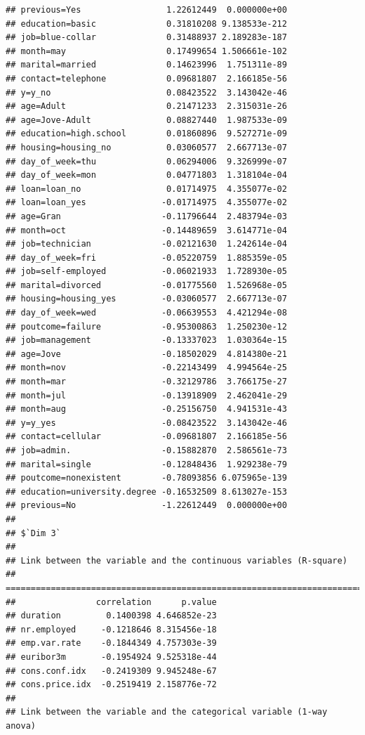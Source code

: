 \documentclass[
]{article}
\begin{document}
\begin{verbatim}
## previous=Yes                 1.22612449  0.000000e+00
## education=basic              0.31810208 9.138533e-212
## job=blue-collar              0.31488937 2.189283e-187
## month=may                    0.17499654 1.506661e-102
## marital=married              0.14623996  1.751311e-89
## contact=telephone            0.09681807  2.166185e-56
## y=y_no                       0.08423522  3.143042e-46
## age=Adult                    0.21471233  2.315031e-26
## age=Jove-Adult               0.08827440  1.987533e-09
## education=high.school        0.01860896  9.527271e-09
## housing=housing_no           0.03060577  2.667713e-07
## day_of_week=thu              0.06294006  9.326999e-07
## day_of_week=mon              0.04771803  1.318104e-04
## loan=loan_no                 0.01714975  4.355077e-02
## loan=loan_yes               -0.01714975  4.355077e-02
## age=Gran                    -0.11796644  2.483794e-03
## month=oct                   -0.14489659  3.614771e-04
## job=technician              -0.02121630  1.242614e-04
## day_of_week=fri             -0.05220759  1.885359e-05
## job=self-employed           -0.06021933  1.728930e-05
## marital=divorced            -0.01775560  1.526968e-05
## housing=housing_yes         -0.03060577  2.667713e-07
## day_of_week=wed             -0.06639553  4.421294e-08
## poutcome=failure            -0.95300863  1.250230e-12
## job=management              -0.13337023  1.030364e-15
## age=Jove                    -0.18502029  4.814380e-21
## month=nov                   -0.22143499  4.994564e-25
## month=mar                   -0.32129786  3.766175e-27
## month=jul                   -0.13918909  2.462041e-29
## month=aug                   -0.25156750  4.941531e-43
## y=y_yes                     -0.08423522  3.143042e-46
## contact=cellular            -0.09681807  2.166185e-56
## job=admin.                  -0.15882870  2.586561e-73
## marital=single              -0.12848436  1.929238e-79
## poutcome=nonexistent        -0.78093856 6.075965e-139
## education=university.degree -0.16532509 8.613027e-153
## previous=No                 -1.22612449  0.000000e+00
## 
## $`Dim 3`
## 
## Link between the variable and the continuous variables (R-square)
## =================================================================================
##                correlation      p.value
## duration         0.1400398 4.646852e-23
## nr.employed     -0.1218646 8.315456e-18
## emp.var.rate    -0.1844349 4.757303e-39
## euribor3m       -0.1954924 9.525318e-44
## cons.conf.idx   -0.2419309 9.945248e-67
## cons.price.idx  -0.2519419 2.158776e-72
## 
## Link between the variable and the categorical variable (1-way anova)

\end{verbatim}
\end{document}
